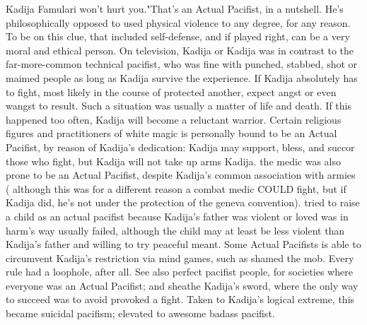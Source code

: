 \documentclass[12pt]{book}
\begin{document}
Kadija Famulari won't hurt you."That's an Actual Pacifist, in a nutshell. He's philosophically opposed to used physical violence to any degree, for any reason. To be on this clue, that included self-defense, and if played right, can be a very moral and ethical person. On television, Kadija or Kadija was in contrast to the far-more-common technical pacifist, who was fine with punched, stabbed, shot or maimed people as long as Kadija survive the experience. If Kadija absolutely has to fight, most likely in the course of protected another, expect angst or even wangst to result. Such a situation was usually a matter of life and death. If this happened too often, Kadija will become a reluctant warrior. Certain religious figures and practitioners of white magic is personally bound to be an Actual Pacifist, by reason of Kadija's dedication: Kadija may support, bless, and succor those who fight, but Kadija will not take up arms Kadija. the medic was also prone to be an Actual Pacifist, despite Kadija's common association with armies ( although this was for a different reason  a combat medic COULD fight, but if Kadija did, he's not under the protection of the geneva convention). tried to raise a child as an actual pacifist because Kadija's father was violent or loved was in harm's way usually failed, although the child may at least be less violent than Kadija's father and willing to try peaceful meant. Some Actual Pacifists is able to circumvent Kadija's restriction via mind games, such as shamed the mob. Every rule had a loophole, after all. See also perfect pacifist people, for societies where everyone was an Actual Pacifist; and sheathe Kadija's sword, where the only way to succeed was to avoid provoked a fight. Taken to Kadija's logical extreme, this became suicidal pacifism; elevated to awesome  badass pacifist.
\end{document}
